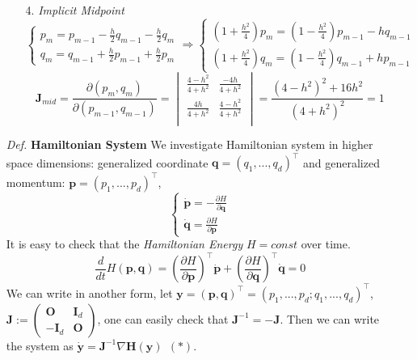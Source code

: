 \documentclass[a4paper, 11pt]{article}
\begin{document}
\begin{itemize}
\begin{itemize}
		\item[4.] \emph{Implicit Midpoint}
		\begin{equation}
			\begin{cases}
			p_m = p_{m-1} - \tfrac{h}{2}q_{m-1} - \tfrac{h}{2}q_{m} \\
			q_m = q_{m-1} + \tfrac{h}{2}p_{m-1} + \tfrac{h}{2}p_{m}
			\end{cases} \Rightarrow
			\begin{cases}
			(1+\tfrac{h^2}{4})p_m = (1-\tfrac{h^2}{4})p_{m-1} - hq_{m-1} \\
			(1+\tfrac{h^2}{4})q_m = (1-\tfrac{h^2}{4})q_{m-1} + hp_{m-1}
			\end{cases}
		\end{equation}
		$$
		\bm{J}_{mid} = \frac{\partial (p_m, q_m)}{\partial (p_{m-1}, q_{m-1})} = 
		\begin{vmatrix}
			\frac{4-h^2}{4+h^2} & \frac{-4h}{4+h^2} \\
			\frac{4h}{4+h^2} & \frac{4-h^2}{4+h^2}\\
		\end{vmatrix} =  \frac{(4-h^2)^2 + 16h^2}{(4+h^2)^2} = 1
		$$
	\end{itemize}

	\item[\textit{Def.}] \textbf{Hamiltonian System} We investigate Hamiltonian system in higher space dimensions: generalized coordinate $\bm{q}=(q_1, ..., q_d)^{\top}$ and generalized momentum: $\bm{p}=(p_1, ..., p_d)^{\top}$,
	\begin{equation}
		\begin{cases}
			\dot{\bm{p}} = - \frac{\partial H}{\partial \bm{q}} \\
			\dot{\bm{q}} = \frac{\partial H}{\partial \bm{p}}
		\end{cases}
	\end{equation}
	It is easy to check that the \emph{Hamiltonian Energy} $H = const$ over time.
	$$
	\frac{d}{dt} H(\bm{p}, \bm{q}) = \left(\frac{\partial H}{\partial \bm{p}}\right)^{\top} \dot{\bm{p}} +  \left(\frac{\partial H}{\partial \bm{q}}\right)^{\top} \dot{\bm{q}} = 0
	$$
	We can write in another form, let $\bm{y}=(\bm{p}, \bm{q})^{\top}=(p_1, ..., p_d; q_1, ..., q_d)^{\top}$, $\bm{J}:=\begin{pmatrix}
		\bm{O} & \bm{I}_d \\
		-\bm{I}_d & \bm{O}
	\end{pmatrix}$, one can easily check that $\bm{J}^{-1} = -\bm{J}$. Then we can write the system as $\dot{\bm{y}} = \bm{J}^{-1} \nabla \bm{H}(\bm{y})~~(*)$.\\


\end{itemize}
\end{document}
